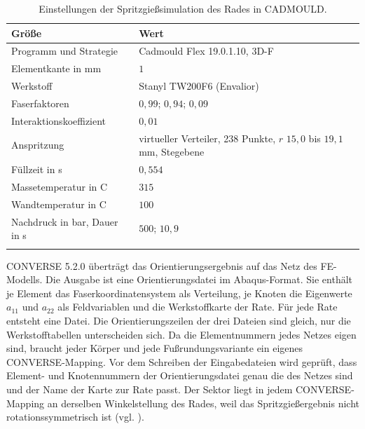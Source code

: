 \begin{table}[htbp]
	\caption{Einstellungen der Spritzgießsimulation des Rades in CADMOULD.}
	\label{tab:cadmould}
	\centering
	\small
	\begin{tabular}{ll}
		\hline
		Größe                            & Wert                                                                       \\
		\hline
		\arrayrulecolor{black!30}
		Programm und Strategie           & Cadmould Flex 19.0.1.10, 3D-F                                              \\
		\hline
		Elementkante in mm               & $1$                                                                        \\
		\hline
		Werkstoff                        & Stanyl TW200F6 (Envalior)                                                  \\
		\hline
		Faserfaktoren                    & $0{,}99$; $0{,}94$; $0{,}09$                                               \\
		\hline
		Interaktionskoeffizient          & $0{,}01$                                                                   \\
		\hline
		Anspritzung                      & virtueller Verteiler, 238 Punkte, $r$ $15{,}0$ bis $19{,}1$\,mm, Stegebene \\
		\hline
		Füllzeit in s                    & $0{,}554$                                                                  \\
		\hline
		Massetemperatur in \textdegree C & $315$                                                                      \\
		\hline
		Wandtemperatur in \textdegree C  & $100$                                                                      \\
		\hline
		Nachdruck in bar, Dauer in s     & $500$; $10{,}9$                                                            \\
		\arrayrulecolor{black}
		\hline
	\end{tabular}
\end{table}

CONVERSE 5.2.0 überträgt das Orientierungsergebnis auf das Netz des FE-Modells. Die Ausgabe ist eine Orientierungsdatei im Abaqus-Format. Sie enthält je Element das Faserkoordinatensystem als Verteilung, je Knoten die Eigenwerte $a_{11}$ und $a_{22}$ als Feldvariablen und die Werkstoffkarte der Rate. Für jede Rate entsteht eine Datei. Die Orientierungszeilen der drei Dateien sind gleich, nur die Werkstofftabellen unterscheiden sich. Da die Elementnummern jedes Netzes eigen sind, braucht jeder Körper und jede Fußrundungsvariante ein eigenes CONVERSE-Mapping. Vor dem Schreiben der Eingabedateien wird geprüft, dass Element- und Knotennummern der Orientierungsdatei genau die des Netzes sind und der Name der Karte zur Rate passt. Der Sektor liegt in jedem CONVERSE-Mapping an derselben Winkelstellung des Rades, weil das Spritzgießergebnis nicht rotationssymmetrisch ist (vgl. ).

